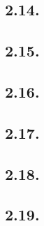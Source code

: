 \documentclass[11pt]{amsart}          %
\begin{document}
\subsection*{2.14.}

\subsection*{2.15.}

\subsection*{2.16.}

\subsection*{2.17.}

\subsection*{2.18.}

\subsection*{2.19.}
\end{document}
